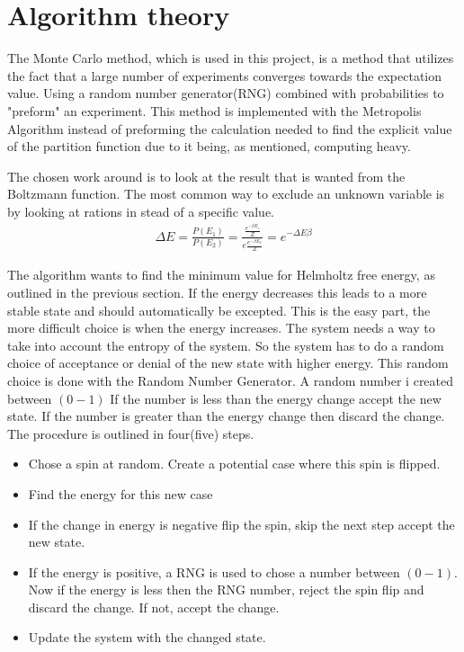 \section{Algorithm theory}

The Monte Carlo method, which is used in this project, is a method that utilizes the fact that a large number of experiments converges towards the expectation value. Using a random number generator(RNG) combined with probabilities to "preform" an experiment. This method is implemented with the Metropolis Algorithm instead of preforming the calculation needed to find the explicit value of the partition function due to it being, as mentioned, computing heavy.

The chosen work around is to look at the result that is wanted from the Boltzmann function. The most common way to exclude an unknown variable is by looking at rations in stead of a specific value.
\begin{align}
	\Delta E=\frac{P(E_1)}{P(E_2)}=\frac{\frac{e^{-\beta E_1}}{Z}}{e\frac{e^{-\beta E_2}}{Z}}=e^{-\Delta E\beta}\label{deltaBoltsmann}
\end{align}

The algorithm wants to find the minimum value for Helmholtz free energy, as outlined in the previous section. If the energy decreases this leads to a more stable state and should automatically be excepted. This is the easy part, the more difficult choice is when the energy increases. The system needs a way to take into account the entropy of the system. So the system has to do a random choice of acceptance or denial of the new state with higher energy. This random choice is done with the Random Number Generator. A random number i created between $(0-1)$ If the number is less than the energy change accept the new state. If the number is greater than the energy change then discard the change. The procedure is outlined in four(five) steps.

\begin{itemize}
	\item Chose a spin at random. Create a potential case where this spin is flipped.
	\item Find the energy for this new case
	\item If the change in energy is negative flip the spin, skip the next step accept the new state. 
	\item If the energy is positive, a RNG is used to chose a number between $(0-1)$. Now if the energy is less then the RNG number, reject the spin flip and discard the change. If not, accept the change.
	\item Update the system with the changed state.
\end{itemize}



